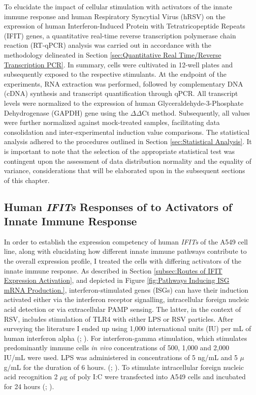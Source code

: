 To elucidate the impact of cellular stimulation with activators of the innate immune response and human Respiratory Syncytial Virus (hRSV) on the expression of human Interferon-Induced Protein with Tetratricopeptide Repeats (IFIT) genes, a quantitative real-time reverse transcription polymerase chain reaction (RT-qPCR) analysis was carried out in accordance with the methodology delineated in Section \ref{sec:Quantitative Real Time/Reverse Transcription PCR}. In summary, cells were cultivated in 12-well plates and subsequently exposed to the respective stimulants. At the endpoint of the experiments, RNA extraction was performed, followed by complementary DNA (cDNA) synthesis and transcript quantification through qPCR. All transcript levels were normalized to the expression of human Glyceraldehyde-3-Phosphate Dehydrogenase (GAPDH) gene using the \(\Delta\)\(\Delta\)Ct method. Subsequently, all values were further normalized against mock-treated samples, facilitating data consolidation and inter-experimental induction value comparisons. The statistical analysis adhered to the procedures outlined in Section \ref{sec:Statistical Analysis}. It is important to note that the selection of the appropriate statistical test was contingent upon the assessment of data distribution normality and the equality of variance, considerations that will be elaborated upon in the subsequent sections of this chapter.

\subsection{Human \textit{IFITs} Responses of to Activators of Innate Immune Response} \label{subsec:Human IFIT Responses to Activators of Innate Immune Response}
In order to establish the expression competency of human \textit{IFITs} of the A549 cell line, along with elucidating how different innate immune pathways contribute to the overall expression profile, I treated the cells with differing activators of the innate immune response. As described in Section \ref{subsec:Routes of IFIT Expression Activation}, and depicted in Figure \ref{fig:Pathways Inducing ISG mRNA Production.},  interferon-stimulated genes (ISGs) can have their induction activated either via the interferon receptor signalling, intracellular foreign nucleic acid detection or via extracellular PAMP sensing. The latter, in the context of RSV, includes stimulation of TLR4 with either LPS or RSV particles. After surveying the literature I ended up using 1,000 international units (IU) per mL of human interferon alpha (\cite{Terenzi2006DistinctISG56}; \cite{Santhakumar2018ChickenViruses}). For interferon-gamma stimulation, which stimulates predominantly immune cells \textit{in vivo} concentrations of 500, 1,000 and 2,000 IU/mL were used. LPS was administered in concentrations of 5 ng/mL and 5 \(\mu\)g/mL for the duration of 6 hours. (\cite{Mears2019Ifit1Cells}; \cite{Zhang2019GrouperResponse}). To stimulate intracellular foreign nucleic acid recognition 2 \(\mu\)g of poly I:C were transfected into A549 cells and incubated for 24 hours (\cite{Mears2019Ifit1Cells}; \cite{Palchetti2015TransfectedCells}).

